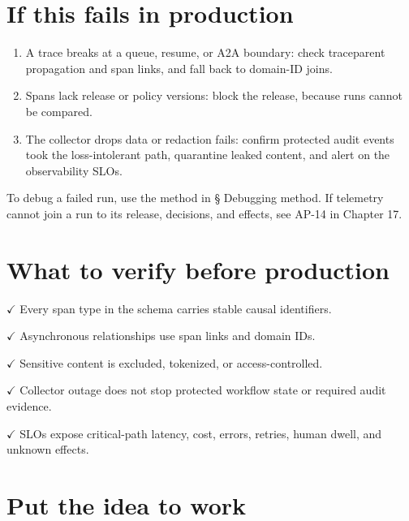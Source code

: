 \section{If this fails in production}

\begin{enumerate}

\item A trace breaks at a queue, resume, or A2A boundary: check traceparent propagation and span links, and fall back to domain-ID joins.

\item Spans lack release or policy versions: block the release, because runs cannot be compared.

\item The collector drops data or redaction fails: confirm protected audit events took the loss-intolerant path, quarantine leaked content, and alert on the observability SLOs.

\end{enumerate}

To debug a failed run, use the method in § Debugging method. If telemetry cannot join a run to its release, decisions, and effects, see AP-14 in Chapter 17.\par

\section{What to verify before production}

\textbf{\ensuremath{\checkmark}} Every span type in the schema carries stable causal identifiers.\par

\textbf{\ensuremath{\checkmark}} Asynchronous relationships use span links and domain IDs.\par

\textbf{\ensuremath{\checkmark}} Sensitive content is excluded, tokenized, or access-controlled.\par

\textbf{\ensuremath{\checkmark}} Collector outage does not stop protected workflow state or required audit evidence.\par

\textbf{\ensuremath{\checkmark}} SLOs expose critical-path latency, cost, errors, retries, human dwell, and unknown effects.\par

\section{Put the idea to work}

